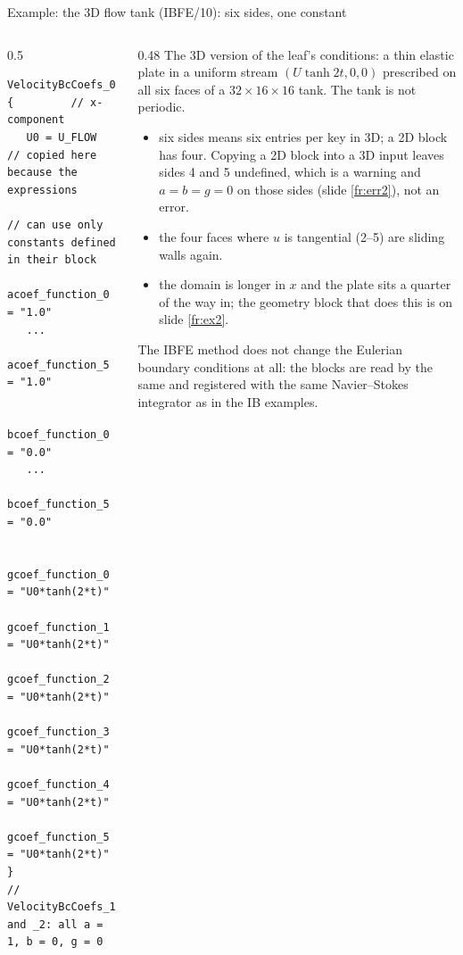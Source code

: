 \documentclass[aspectratio=169,11pt]{beamer}
\begin{document}
\begin{frame}[fragile]{Example: the 3D flow tank (IBFE/10): six sides, one constant}
\label{fr:ibfe10}
\begin{columns}[T,onlytextwidth]
\begin{column}{0.5\textwidth}
\begin{lstlisting}[style=inputtiny]
VelocityBcCoefs_0 {         // x-component
   U0 = U_FLOW   // copied here because the expressions
                 // can use only constants defined in their block
   acoef_function_0 = "1.0"
   ...
   acoef_function_5 = "1.0"

   bcoef_function_0 = "0.0"
   ...
   bcoef_function_5 = "0.0"

   gcoef_function_0 = "U0*tanh(2*t)"
   gcoef_function_1 = "U0*tanh(2*t)"
   gcoef_function_2 = "U0*tanh(2*t)"
   gcoef_function_3 = "U0*tanh(2*t)"
   gcoef_function_4 = "U0*tanh(2*t)"
   gcoef_function_5 = "U0*tanh(2*t)"
}
// VelocityBcCoefs_1 and _2: all a = 1, b = 0, g = 0
\end{lstlisting}
\end{column}
\begin{column}{0.48\textwidth}
\scriptsize The 3D version of the leaf's conditions: a thin elastic plate in a uniform stream $(U\tanh 2t, 0, 0)$ prescribed on all six faces of a $32 \times 16 \times 16$ tank. The tank is not periodic.
\begin{itemize}
  \item six sides means six entries per key in 3D; a 2D block has four. Copying a 2D block into a 3D input leaves sides 4 and 5 undefined, which is a warning and $a = b = g = 0$ on those sides (slide \ref{fr:err2}), not an error.
  \item the four faces where $u$ is tangential (2--5) are sliding walls again.
  \item the domain is longer in $x$ and the plate sits a quarter of the way in; the geometry block that does this is on slide \ref{fr:ex2}.
\end{itemize}
\scriptsize The IBFE method does not change the Eulerian boundary conditions at all: the blocks are read by the same  and registered with the same Navier--Stokes integrator as in the IB examples.
\end{column}
\end{columns}
\end{frame}
\end{document}
